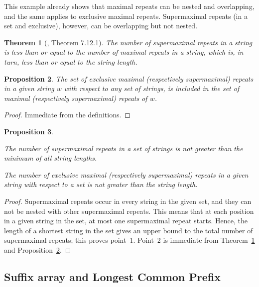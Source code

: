 \documentclass[submission]{dmtcs}
\newcommand\+[1]{\mathcal{#1}}
\newtheorem{theorem}{Theorem}
\newtheorem{proposition}[theorem]{Proposition}
\newenvironment{my_enumerate}{\begin{enumerate}
  \setlength{\itemsep}{1pt}
  \setlength{\parskip}{0pt}
  \setlength{\parsep}{0pt}}{\end{enumerate}}
\begin{document}
This example already shows that maximal repeats can be nested and 
overlapping, and the same applies to exclusive maximal repeats. Supermaximal
repeats (in a set and exclusive), however, can be overlapping but not
nested. 

\begin{theorem}[\cite{gusfield}, Theorem 7.12.1]\label{thm:cantidad}
The number of supermaximal repeats in a string is less than or equal to the
number of maximal repeats in a string, which is, in turn, less than or equal to
the string length.
\end{theorem}

\begin{proposition}\label{prop:inclusion}
The set of exclusive maximal (respectively supermaximal) repeats in a given
string $w$ with respect to any set of strings,
is included in the set of maximal (respectively supermaximal) repeats of $w$.
\end{proposition}
\begin{proof}
Immediate from the definitions.
\end{proof}

\begin{proposition} \label{prop:cant-exclusive-} \
\begin{my_enumerate}
\item The number of supermaximal repeats in a set of strings
       is not greater than the minimum of all string lengths.
\item The number of exclusive maximal (respectively supermaximal) 
repeats in a given string  with respect to a set is not greater than the
	string length.
\end{my_enumerate} 
\end{proposition}
\begin{proof}
Supermaximal repeats occur in every string in the given set, and 
they can not be nested with other supermaximal repeats. This means that at
each position in a given string in the set, at most one supermaximal repeat
starts.
Hence, the length of a shortest string in the set gives an upper bound 
to the total number of supermaximal repeats; this proves point~1.
Point~2 is immediate from Theorem~\ref{thm:cantidad} and
Proposition~\ref{prop:inclusion}.
\end{proof}

\subsection{Suffix array and Longest Common Prefix}
\end{document}
